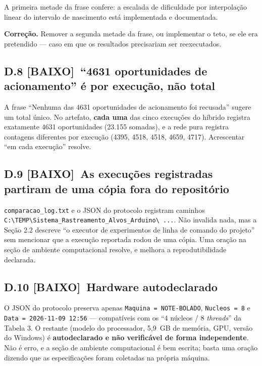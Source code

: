 \documentclass[11pt,a4paper]{article}
\newcommand{\baixo}{\textbf{\color{gray}[BAIXO]}}
\begin{document}
A primeira metade da frase confere: a escalada de dificuldade por interpolação linear do intervalo de
nascimento está implementada e documentada.

\textbf{Correção.} Remover a segunda metade da frase, ou implementar o teto, se ele era pretendido ---
caso em que os resultados precisariam ser reexecutados.

\subsection*{D.8 \baixo\ ``4631 oportunidades de acionamento'' é por execução, não total}

A frase ``Nenhuma das 4631 oportunidades de acionamento foi recusada'' sugere um total único. No
artefato, \textbf{cada uma} das cinco execuções do híbrido registra exatamente 4631 oportunidades
(23.155 somadas), e a rede pura registra contagens diferentes por execução (4395, 4518, 4518, 4659,
4717). Acrescentar ``em cada execução'' resolve.

\subsection*{D.9 \baixo\ As execuções registradas partiram de uma cópia fora do repositório}

\texttt{comparacao\_log.txt} e o JSON do protocolo registram caminhos
\texttt{C:\textbackslash TEMP\textbackslash Sistema\_Rastreamento\_Alvos\_Arduino\textbackslash
...}. Não invalida nada, mas a Seção 2.2 descreve ``o executor de experimentos de linha de comando do
projeto'' sem mencionar que a execução reportada rodou de uma cópia. Uma oração na seção de ambiente
computacional resolve, e melhora a reprodutibilidade declarada.

\subsection*{D.10 \baixo\ Hardware autodeclarado}

O JSON do protocolo preserva apenas \texttt{Maquina = NOTE-BOLADO}, \texttt{Nucleos = 8} e
\texttt{Data = 2026-11-09 12:56} --- compatíveis com os ``4 núcleos / 8 \textit{threads}'' da Tabela 3.
O restante (modelo do processador, 5,9~GB de memória, GPU, versão do Windows) é \textbf{autodeclarado
e não verificável de forma independente}. Não é erro, e a seção de ambiente computacional é bem
escrita; basta uma oração dizendo que as especificações foram coletadas na própria máquina.
\end{document}
